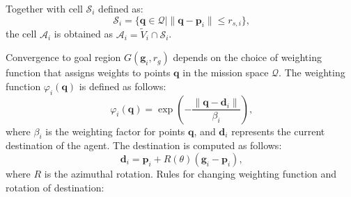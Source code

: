         Together with cell $\mathcal{S}_i$ defined as: 
        \begin{equation}
            \mathcal{S}_i = \{\mathbf{q} \in \mathcal{Q} | \| \mathbf{q} - \mathbf{p}_i \| \leq r_{s,i}\}\text{,}
        \end{equation}
        the cell $\mathcal{A}_i$ is obtained as $\mathcal{A}_i = \tilde{V}_i \cap \mathcal{S}_i$.

        Convergence to goal region $G(\mathbf{g}_i, r_g )$ depends on the choice of weighting function that assigns weights to points $\mathbf{q}$ in the mission space $\mathcal{Q}$.
        The weighting function $\varphi_i(\mathbf{q})$ is defined as follows: 
        \begin{equation}
            \varphi_i(\mathbf{q}) = \exp\left(-\frac{\|\mathbf{q} - \mathbf{d}_i\|}{\beta_i}\right)\text{,}
        \end{equation}
        where $\beta_i$ is the weighting factor for points $\mathbf{q}$, and $\mathbf{d}_i$ represents the current destination of the agent. 
        The destination is computed as follows:
        \begin{equation}
            \mathbf{d}_i = \mathbf{p}_i + R(\theta)(\mathbf{g}_i - \mathbf{p}_i)\text{,}
        \end{equation}
        where $R$ is the azimuthal rotation.
        Rules for changing weighting function and rotation of destination: 
